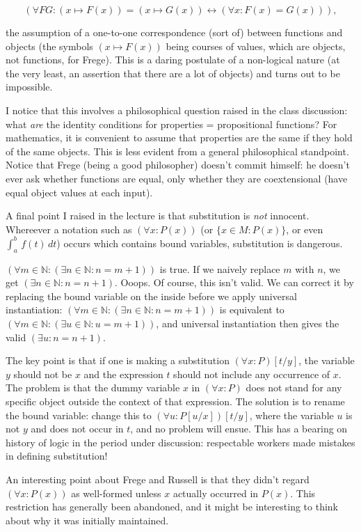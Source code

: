 \documentclass[12pt]{article}
\begin{document}
$$(\forall FG:(x \mapsto F(x)) = (x \mapsto G(x)) \leftrightarrow (\forall x:F(x) =G(x))),$$

the assumption of a one-to-one correspondence (sort of) between functions and objects (the symbols $(x \mapsto F(x))$ being courses of values, which are objects, not functions, for Frege).  This is a daring postulate of a non-logical nature (at the very least, an assertion that there are a lot of objects) and turns out to be impossible.

I notice that this involves a philosophical question raised in the class discussion:  what {\em are\/} the identity conditions for properties = propositional functions?  For mathematics, it is convenient to assume that properties are the same if they hold of the same objects.  This is less evident from a general philosophical standpoint.  Notice that Frege (being a good philosopher) doesn't commit himself:  he doesn't ever ask whether functions are equal, only whether they are coextensional (have equal object values at each input).

A final point I raised in the lecture is that substitution is {\em not\/} innocent.  Whereever a notation such as $(\forall x:P(x))$
(or $\{x \in M:P(x)\}$, or even $\int_a^b\, f(t)\,dt$) occurs which contains bound variables, substitution is dangerous.

$(\forall m \in {\mathbb N}:(\exists n \in {\mathbb N}:n = m+1))$ is true.  If we naively replace $m$ with $n$, we get
$(\exists n\in {\mathbb N}:n = n+1)$.  Ooops.  Of course, this isn't valid.  We can correct it by replacing the bound variable
on the inside before we apply universal instantiation:  $(\forall m \in {\mathbb N}:(\exists n \in {\mathbb N}:n = m+1))$ is equivalent to $(\forall m \in {\mathbb N}:(\exists u \in {\mathbb N}:u = m+1))$, and universal instantiation then gives the valid
$(\exists u:n = n+1)$.

The key point is that if one is making a substitution $(\forall x:P)[t/y]$, the variable $y$ should not be $x$ and the expression $t$ should not include any occurrence of $x$.  The problem is that the dummy variable $x$ in $(\forall x:P)$ does not stand for any specific object outside the context of that expression.  The solution is to rename the bound variable:  change this to
$(\forall u:P[u/x])[t/y]$, where the variable $u$ is not $y$ and does not occur in $t$, and no problem will ensue.  This has a bearing on history of logic in the period under discussion:  respectable workers made mistakes in defining substitution!

An interesting point about Frege and Russell is that they didn't regard $(\forall x:P(x))$ as well-formed unless $x$ actually occurred in $P(x)$.  This restriction has generally been abandoned, and it might be interesting to think about why it was initially maintained.
\end{document}

